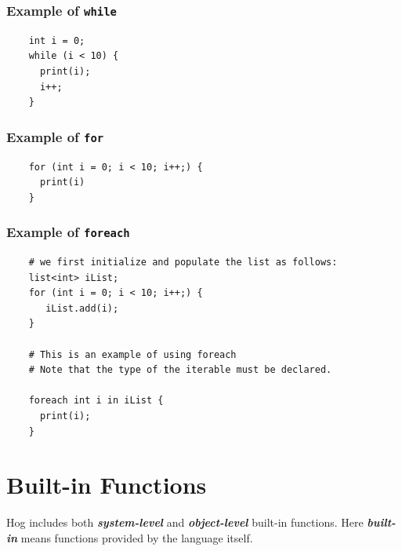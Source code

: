 \documentclass{report}
\begin{document}
\subsubsection{Example of \tt while \rm} %
\label{ssub:example_1}

\begin{verbatim}
    int i = 0;
    while (i < 10) {
      print(i);
      i++;
    }

\end{verbatim}


\subsubsection{Example of \tt for \rm} %
\label{ssub:example_2}

\begin{verbatim}
    for (int i = 0; i < 10; i++;) {
      print(i)
    }
\end{verbatim}


\subsubsection{Example of \tt foreach \rm} %
\label{ssub:example_3}

\begin{verbatim}
    # we first initialize and populate the list as follows: 
    list<int> iList;
    for (int i = 0; i < 10; i++;) {
       iList.add(i);
    }

    # This is an example of using foreach
    # Note that the type of the iterable must be declared.    

    foreach int i in iList {
      print(i);
    }
\end{verbatim}




\section{Built-in Functions} %
\label{sec:built_in_functions}

Hog includes both \emph{\textbf{system-level}} and \emph{\textbf{object-level}}
built-in functions. Here \emph{\textbf{built-in}} means functions provided by the
language itself.
\end{document}
